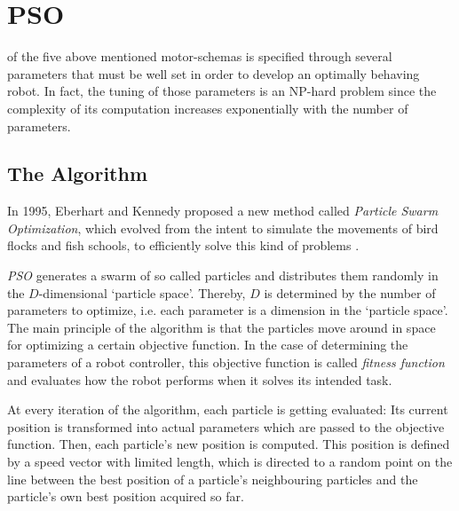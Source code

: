 \documentclass[journal]{IEEEtran}
\begin{document}



\section{PSO}
\label{sec:3}

 of the five above mentioned motor-schemas is specified through several parameters that 
must be well set in order to develop an optimally behaving robot. In fact, the tuning of those 
parameters is an NP-hard problem since the complexity of its computation increases 
exponentially with the number of parameters.

\subsection{The Algorithm}
In 1995, Eberhart and Kennedy proposed a new method called \textit{Particle Swarm Optimization}, which evolved from the intent to simulate the movements of bird flocks and fish schools, to efficiently solve this kind of problems \cite{IEEEhowto:first_pso}. 

\textit{PSO} generates a swarm of so called particles and distributes them randomly in the $D$-dimensional `particle space'. Thereby, $D$ is determined by the number of parameters to 
optimize, i.e. each parameter is a dimension in the `particle space'. The main principle of 
the algorithm is that the particles move around in space for optimizing a certain objective 
function. In the case of determining the parameters of a robot controller, this objective 
function is called \textit{fitness function} and evaluates how the robot performs when it 
solves its intended task. 

At every iteration of the algorithm, each particle is getting evaluated: Its current position 
is transformed into actual parameters which are passed to the objective function. Then, each 
particle's new position is computed. This position is defined by a speed vector with limited 
length, which is directed to a random point on the line between the best position of a 
particle's neighbouring particles and the particle's own best position acquired so far. 
\end{document}
